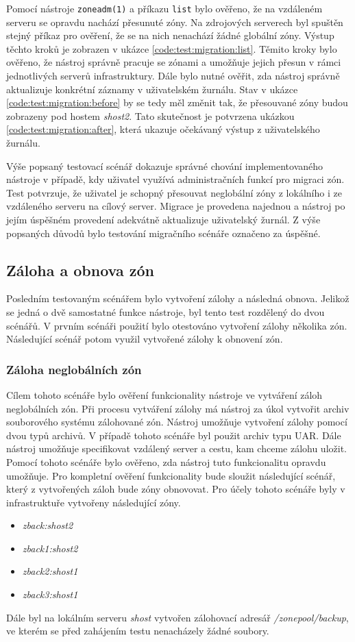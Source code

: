 Pomocí nástroje \verb|zoneadm(1)| a příkazu \verb|list| bylo ověřeno, že na vzdáleném serveru se opravdu nachází přesunuté zóny.
Na zdrojových serverech byl spuštěn stejný příkaz pro ověření, že se na nich nenachází žádné globální zóny. Výstup těchto kroků
je zobrazen v ukázce \ref{code:test:migration:list}. Těmito kroky bylo ověřeno, že nástroj správně pracuje se zónami a umožňuje
jejich přesun v rámci jednotlivých serverů infrastruktury. Dále bylo nutné ověřit, zda nástroj správně aktualizuje konkrétní záznamy
v uživatelském žurnálu. Stav v ukázce \ref{code:test:migration:before} by se tedy měl změnit tak, že přesouvané zóny budou
zobrazeny pod hostem \textit{shost2}. Tato skutečnost je potvrzena ukázkou \ref{code:test:migration:after}, která ukazuje očekávaný
výstup z uživatelského žurnálu.

Výše popsaný testovací scénář dokazuje správné chování implementovaného nástroje v případě, kdy uživatel využívá administračních
funkcí pro migraci zón. Test potvrzuje, že uživatel je schopný přesouvat neglobální zóny z lokálního i ze vzdáleného serveru
na cílový server. Migrace je provedena najednou a nástroj po jejím úspěšném provedení adekvátně aktualizuje uživatelský žurnál.
Z výše popsaných důvodů bylo testování migračního scénáře označeno za úspěšné.
\subsection{Záloha a obnova zón}
\label{chapter:testing:scenario:backup_recovery}
Posledním testovaným scénářem bylo vytvoření zálohy a následná obnova. Jelikož se jedná o dvě samostatné funkce nástroje, byl
tento test rozdělený do dvou scénářů. V prvním scénáři použití bylo otestováno vytvoření zálohy několika zón. Následující scénář
potom využil vytvořené zálohy k obnovení zón.
\subsubsection{Záloha neglobálních zón}
\label{chapter:testing:scenario:backup_recovery:backup}
Cílem tohoto scénáře bylo ověření funkcionality nástroje ve vytváření záloh neglobálních zón. Při procesu vytváření zálohy má
nástroj za úkol vytvořit archiv souborového systému zálohované zón. Nástroj umožňuje vytvoření zálohy pomocí dvou typů archivů.
V případě tohoto scénáře byl použit archiv typu UAR. Dále nástroj umožňuje specifikovat vzdálený server a cestu, kam chceme
zálohu uložit. Pomocí tohoto scénáře bylo ověřeno, zda nástroj tuto funkcionalitu opravdu umožňuje. Pro kompletní ověření
funkcionality bude sloužit následující scénář, který z vytvořených záloh bude zóny obnovovat. Pro účely tohoto scénáře byly v infrastruktuře vytvořeny následující 
zóny.
\begin{itemize}
 \item \textit{zback:shost2}
 \item \textit{zback1:shost2}
 \item \textit{zback2:shost1}
 \item \textit{zback3:shost1}
\end{itemize}
Dále byl na lokálním serveru \textit{shost} vytvořen zálohovací adresář \textit{/zonepool/backup}, ve kterém se před zahájením
testu nenacházely žádné soubory.

